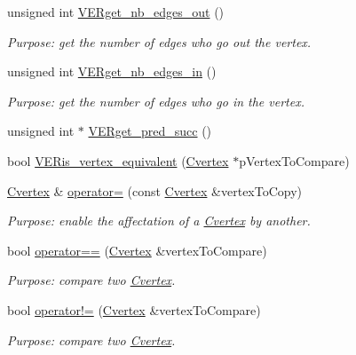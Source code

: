 \begin{DoxyCompactItemize}
unsigned int \hyperlink{class_cvertex_a887835cc19a342b774cf5426f27093c3}{V\+E\+Rget\+\_\+nb\+\_\+edges\+\_\+out} ()
\begin{DoxyCompactList}\small\item\em Purpose\+: get the number of edges who go out the vertex. \end{DoxyCompactList}\item 
unsigned int \hyperlink{class_cvertex_ab94674408a2d7c7bb651ab2ef0432d16}{V\+E\+Rget\+\_\+nb\+\_\+edges\+\_\+in} ()
\begin{DoxyCompactList}\small\item\em Purpose\+: get the number of edges who go in the vertex. \end{DoxyCompactList}\item 
unsigned int $\ast$ \hyperlink{class_cvertex_af741ade2dfb1c3b5839c2bdf1be1bff9}{V\+E\+Rget\+\_\+pred\+\_\+succ} ()
\item 
bool \hyperlink{class_cvertex_ad7afc0debf91cb6e6aae63a31439f5e9}{V\+E\+Ris\+\_\+vertex\+\_\+equivalent} (\hyperlink{class_cvertex}{Cvertex} $\ast$p\+Vertex\+To\+Compare)
\item 
\hyperlink{class_cvertex}{Cvertex} \& \hyperlink{class_cvertex_a8310facad7189774fd01cb2dcc4e975f}{operator=} (const \hyperlink{class_cvertex}{Cvertex} \&vertex\+To\+Copy)
\begin{DoxyCompactList}\small\item\em Purpose\+: enable the affectation of a \hyperlink{class_cvertex}{Cvertex} by another. \end{DoxyCompactList}\item 
bool \hyperlink{class_cvertex_a57b1f8e53f55ec33efdb7f62e9ea2584}{operator==} (\hyperlink{class_cvertex}{Cvertex} \&vertex\+To\+Compare)
\begin{DoxyCompactList}\small\item\em Purpose\+: compare two \hyperlink{class_cvertex}{Cvertex}. \end{DoxyCompactList}\item 
bool \hyperlink{class_cvertex_a2f3a0e226d96aacd1803e32278bd5930}{operator!=} (\hyperlink{class_cvertex}{Cvertex} \&vertex\+To\+Compare)
\begin{DoxyCompactList}\small\item\em Purpose\+: compare two \hyperlink{class_cvertex}{Cvertex}. \end{DoxyCompactList}\end{DoxyCompactItemize}
